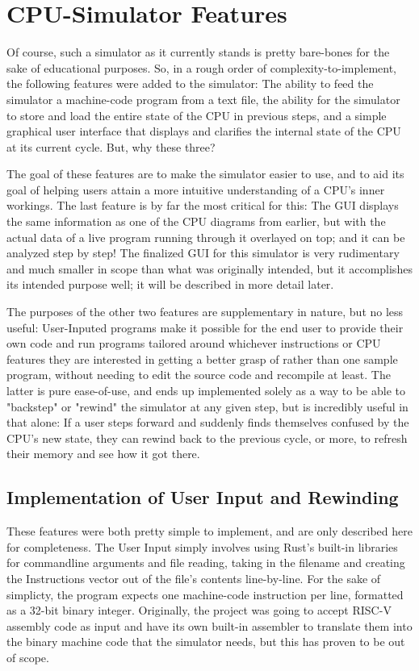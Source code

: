 \documentclass[12pt,twoside]{reedthesis}
\begin{document}
\section{CPU-Simulator Features}

Of course, such a simulator as it currently stands is pretty bare-bones for the sake of educational purposes. So, in a rough order of complexity-to-implement, the following features were added to the simulator: The ability to feed the simulator a machine-code program from a text file, the ability for the simulator to store and load the entire state of the CPU in previous steps, and a simple graphical user interface that displays and clarifies the internal state of the CPU at its current cycle. But, why these three?

The goal of these features are to make the simulator easier to use, and to aid its goal of helping users attain a more intuitive understanding of a CPU's inner workings. The last feature is by far the most critical for this: The GUI displays the same information as one of the CPU diagrams from earlier, but with the actual data of a live program running through it overlayed on top; and it can be analyzed step by step! The finalized GUI for this simulator is very rudimentary and much smaller in scope than what was originally intended, but it accomplishes its intended purpose well; it will be described in more detail later.

The purposes of the other two features are supplementary in nature, but no less useful: User-Inputed programs make it possible for the end user to provide their own code and run programs tailored around whichever instructions or CPU features they are interested in getting a better grasp of rather than one sample program, without needing to edit the source code and recompile at least. The latter is pure ease-of-use, and ends up implemented solely as a way to be able to "backstep" or "rewind" the simulator at any given step, but is incredibly useful in that alone: If a user steps forward and suddenly finds themselves confused by the CPU's new state, they can rewind back to the previous cycle, or more, to refresh their memory and see how it got there.

\subsection*{Implementation of User Input and Rewinding}

These features were both pretty simple to implement, and are only described here for completeness. The User Input simply involves using Rust's built-in libraries for commandline arguments and file reading, taking in the filename and creating the Instructions vector out of the file's contents line-by-line. For the sake of simplicty, the program expects one machine-code instruction per line, formatted as a 32-bit binary integer. Originally, the project was going to accept RISC-V assembly code as input and have its own built-in assembler to translate them into the binary machine code that the simulator needs, but this has proven to be out of scope.
\end{document}
